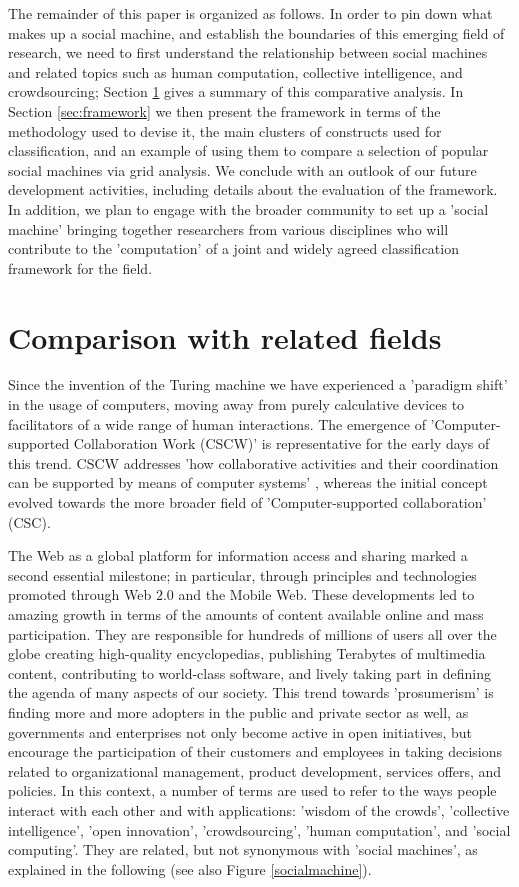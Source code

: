 \documentclass{sig-alternate}
\begin{document}
The remainder of this paper is organized as follows. In order to pin down what makes up a social machine, and establish the boundaries of this emerging field of research, we need to first understand the relationship between social machines and related topics such as human computation, collective intelligence, and crowdsourcing; Section \ref{sec:comparison} gives a summary of this comparative analysis. In Section \ref{sec:framework} we then present the framework in terms of the methodology used to devise it, the main clusters of constructs used for classification, and an example of using them to compare a selection of popular social machines via grid analysis. We conclude with an outlook of our future development activities, including details about the evaluation of the framework. In addition, we plan to engage with the broader community to set up a 'social machine' bringing together researchers from various disciplines who will contribute to the 'computation' of a joint and widely agreed classification framework for the field.

\section{Comparison with related fields}
\label{sec:comparison}
Since the invention of the Turing machine we have experienced a 'paradigm shift' in the usage of computers, moving away from purely calculative devices to facilitators of a wide range of human interactions. The emergence of 'Computer-supported Collaboration Work (CSCW)' \cite{grudin1994computer} is representative for the early days of this trend. CSCW addresses 'how collaborative activities and their coordination can be supported by means of computer systems' \cite{grudin1994computer}, whereas the initial concept evolved towards the more broader field of 'Computer-supported collaboration' (CSC). 

The Web as a global platform for information access and sharing marked a second essential milestone; in particular, through principles and technologies promoted through Web $2.0$ and the Mobile Web. These developments led to amazing growth in terms of the amounts of content available online and mass participation. They are responsible for hundreds of millions of users all over the globe creating high-quality encyclopedias, publishing Terabytes of multimedia content, contributing to world-class software, and lively taking part in defining the agenda of many aspects of our society. This trend towards 'prosumerism' is finding more and more adopters in the public and private sector as well, as governments and enterprises not only become active in open initiatives, but encourage the participation of their customers and employees in taking decisions related to organizational management, product development, services offers, and policies. In this context, a number of terms are used to refer to the ways people interact with each other and with applications: 'wisdom of the crowds', 'collective intelligence', 'open innovation', 'crowdsourcing', 'human computation', and 'social computing'. They are related, but not synonymous with 'social machines', as explained in the following (see also Figure \ref{socialmachine}).
\end{document}

